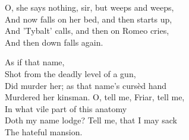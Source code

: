 \documentclass[10pt,a4paper]{article}
\begin{document}
\begin{drama*}
\nursespeaks O, she says nothing, sir, but weeps and weeps,\\
And now falls on her bed, and then starts up,\\
And 'Tybalt' calls, and then on Romeo cries,\\
And then down falls again.

\romspeaks \hspace{10.5em} As if that name,\\
Shot from the deadly level of a gun,\\
Did murder her; as that name’s cursèd hand\\
Murdered her kinsman. O, tell me, Friar, tell me,\\
In what vile part of this anatomy\\
Doth my name lodge? Tell me, that I may sack\\
The hateful mansion.


\end{drama*}
\end{document}
